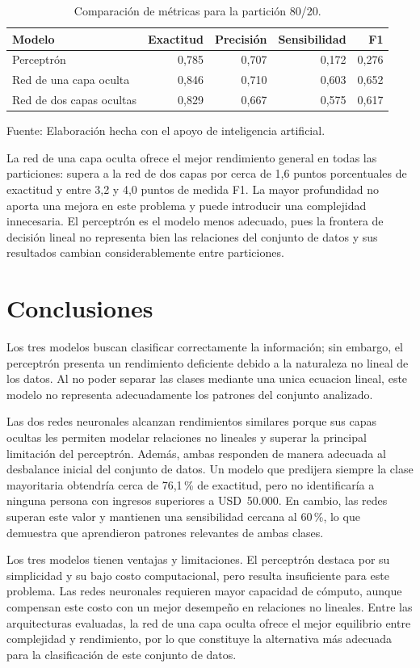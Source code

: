 \documentclass[12pt,letterpaper,oneside]{article}
\newcommand{\fuenteAI}{\par\centering\footnotesize Fuente: Elaboración hecha con el apoyo de inteligencia artificial.}
\begin{document}
\begin{table}[H]
    \centering
    \caption{Comparación de métricas para la partición 80/20.}
    \begin{tabular}{lrrrr}
        \hline
        Modelo & Exactitud & Precisión & Sensibilidad & F1 \\
        \hline
        Perceptrón & 0,785 & 0,707 & 0,172 & 0,276 \\
        Red de una capa oculta & 0,846 & 0,710 & 0,603 & 0,652 \\
        Red de dos capas ocultas & 0,829 & 0,667 & 0,575 & 0,617 \\
        \hline
    \end{tabular}
    \fuenteAI
\end{table}

La red de una capa oculta ofrece el mejor rendimiento general en todas las particiones: supera a la red de dos capas por cerca de 1,6 puntos porcentuales de exactitud y entre 3,2 y 4,0 puntos de medida F1. La mayor profundidad no aporta una mejora en este problema y puede introducir una complejidad innecesaria. El perceptrón es el modelo menos adecuado, pues la frontera de decisión lineal no representa bien las relaciones del conjunto de datos y sus resultados cambian considerablemente entre particiones.

\section{Conclusiones}

Los tres modelos buscan clasificar correctamente la información; sin embargo, el perceptrón presenta un rendimiento deficiente debido a la naturaleza no lineal de los datos. Al no poder separar las clases mediante una unica ecuacion lineal, este modelo no representa adecuadamente los patrones del conjunto analizado.

Las dos redes neuronales alcanzan rendimientos similares porque sus capas ocultas les permiten modelar relaciones no lineales y superar la principal limitación del perceptrón. Además, ambas responden de manera adecuada al desbalance inicial del conjunto de datos. Un modelo que predijera siempre la clase mayoritaria obtendría cerca de 76,1\,\% de exactitud, pero no identificaría a ninguna persona con ingresos superiores a USD~50.000. En cambio, las redes superan este valor y mantienen una sensibilidad cercana al 60\,\%, lo que demuestra que aprendieron patrones relevantes de ambas clases.

Los tres modelos tienen ventajas y limitaciones. El perceptrón destaca por su simplicidad y su bajo costo computacional, pero resulta insuficiente para este problema. Las redes neuronales requieren mayor capacidad de cómputo, aunque compensan este costo con un mejor desempeño en relaciones no lineales. Entre las arquitecturas evaluadas, la red de una capa oculta ofrece el mejor equilibrio entre complejidad y rendimiento, por lo que constituye la alternativa más adecuada para la clasificación de este conjunto de datos.
\end{document}
